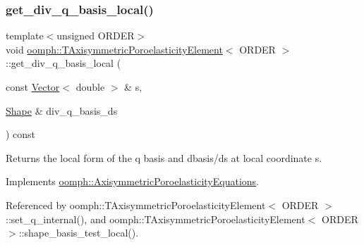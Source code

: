 \subsubsection{\texorpdfstring{get\+\_\+div\+\_\+q\+\_\+basis\+\_\+local()}{get\_div\_q\_basis\_local()}\hspace{0.1cm}{\footnotesize\ttfamily [3/3]}}
{\footnotesize\ttfamily template$<$unsigned O\+R\+D\+ER$>$ \\
void \hyperlink{classoomph_1_1TAxisymmetricPoroelasticityElement}{oomph\+::\+T\+Axisymmetric\+Poroelasticity\+Element}$<$ O\+R\+D\+ER $>$\+::get\+\_\+div\+\_\+q\+\_\+basis\+\_\+local (\begin{DoxyParamCaption}\item[{const \hyperlink{classoomph_1_1Vector}{Vector}$<$ double $>$ \&}]{s,  }\item[{\hyperlink{classoomph_1_1Shape}{Shape} \&}]{div\+\_\+q\+\_\+basis\+\_\+ds }\end{DoxyParamCaption}) const\hspace{0.3cm}{\ttfamily [virtual]}}



Returns the local form of the q basis and dbasis/ds at local coordinate s. 



Implements \hyperlink{classoomph_1_1AxisymmetricPoroelasticityEquations_abe3e6e28eb58ae719a6180d0d57b1815}{oomph\+::\+Axisymmetric\+Poroelasticity\+Equations}.



Referenced by oomph\+::\+T\+Axisymmetric\+Poroelasticity\+Element$<$ O\+R\+D\+E\+R $>$\+::set\+\_\+q\+\_\+internal(), and oomph\+::\+T\+Axisymmetric\+Poroelasticity\+Element$<$ O\+R\+D\+E\+R $>$\+::shape\+\_\+basis\+\_\+test\+\_\+local().

\mbox{\label{classoomph_1_1TAxisymmetricPoroelasticityElement_ae2b824db26087cecbb5a20d14931354a}} 
